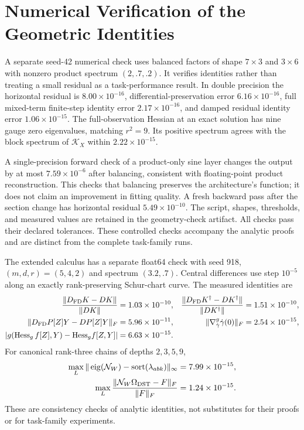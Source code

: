 \section{Numerical Verification of the Geometric Identities}
A separate seed-42 numerical check uses balanced factors of shape $7\times3$ and $3\times6$ with nonzero product spectrum $(2,.7,.2)$. It verifies identities rather than treating a small residual as a task-performance result. In double precision the horizontal residual is $8.00\times10^{-16}$, differential-preservation error $6.16\times10^{-16}$, full mixed-term finite-step identity error $2.17\times10^{-16}$, and damped residual identity error $1.06\times10^{-15}$. The full-observation Hessian at an exact solution has nine gauge zero eigenvalues, matching $r^2=9$. Its positive spectrum agrees with the block spectrum of $\mathcal K_X$ within $2.22\times10^{-15}$.

A single-precision forward check of a product-only sine layer changes the output by at most $7.59\times10^{-6}$ after balancing, consistent with floating-point product reconstruction. This checks that balancing preserves the architecture's function; it does not claim an improvement in fitting quality. A fresh backward pass after the section change has horizontal residual $5.49\times10^{-10}$. The script, shapes, thresholds, and measured values are retained in the geometry-check artifact. All checks pass their declared tolerances. These controlled checks accompany the analytic proofs and are distinct from the complete task-family runs.

The extended calculus has a separate float64 check with seed 918,
$(m,d,r)=(5,4,2)$ and spectrum $(3.2,.7)$. Central differences use
step $10^{-5}$ along an exactly rank-preserving Schur-chart curve.
The measured identities are
\begin{align}
\frac{\|D_{\rm FD}K-DK\|}{\|DK\|}&=1.03\times10^{-10},&
\frac{\|D_{\rm FD}K^\dagger-DK^\dagger\|}{\|DK^\dagger\|}
&=1.51\times10^{-10},\\
\|D_{\rm FD}P[Z]Y-DP[Z]Y\|_F&=5.96\times10^{-11},&
\|\nabla^g_{\dot\gamma}\dot\gamma(0)\|_F&=2.54\times10^{-15},\\
|g(\operatorname{Hess}_g f[Z],Y)-{\rm Hess}_g f[Z,Y]|
&=6.63\times10^{-15}.
\end{align}
For canonical rank-three chains of depths $2,3,5,9$,
\begin{align}
\max_L\|\operatorname{eig}(\mathcal N_W)
-\operatorname{sort}(\lambda_{abk})\|_\infty
&=7.99\times10^{-15},\\
\max_L\frac{\|\mathcal N_W\Omega_{\rm DST}-F\|_F}{\|F\|_F}
&=1.24\times10^{-15}.
\end{align}
These are consistency checks of analytic identities, not substitutes
for their proofs or for task-family experiments.

